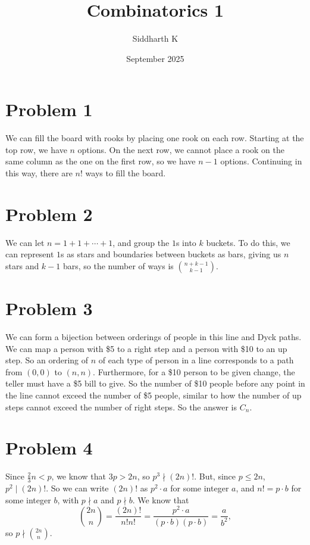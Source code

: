 \documentclass{article}
\title{Combinatorics 1}
\author{Siddharth K}
\date{September 2025}
\begin{document}
\maketitle

\section*{Problem 1}
We can fill the board with rooks by placing one rook on each row. Starting at the top row, we have $n$ options. On the next row, we cannot place a rook on the same column as the one on the first row, so we have $n - 1$ options. Continuing in this way, there are $n!$ ways to fill the board.

\section*{Problem 2}
We can let $n = 1 + 1 + \cdots + 1$, and group the $1$s into $k$ buckets. To do this, we can represent $1$s as stars and boundaries between buckets as bars, giving us $n$ stars and $k - 1$ bars, so the number of ways is $\binom{n + k - 1}{k - 1}$.

\section*{Problem 3}
We can form a bijection between orderings of people in this line and Dyck paths. We can map a person with \$5 to a right step and a person with \$10 to an up step. So an ordering of $n$ of each type of person in a line corresponds to a path from $(0, 0)$ to $(n, n)$. Furthermore, for a \$10 person to be given change, the teller must have a \$5 bill to give. So the number of \$10 people before any point in the line cannot exceed the number of \$5 people, similar to how the number of up steps cannot exceed the number of right steps. So the answer is $C_n$.

\section*{Problem 4}
Since $\frac{2}{3}n < p$, we know that $3p > 2n$, so $p^3 \nmid (2n)!$. But, since $p \le 2n$, $p^2 \mid (2n)!$. So we can write $(2n)!$ as $p^2 \cdot a$ for some integer $a$, and $n! = p\cdot b$ for some integer $b$, with $p \nmid a$ and $p \nmid b$. We know that
$$\binom{2n}{n} = \frac{(2n)!}{n!n!} = \frac{p^2\cdot a}{(p\cdot b)(p\cdot b)} = \frac{a}{b^2},$$
so $p \nmid \binom{2n}{n}$.
\end{document}
